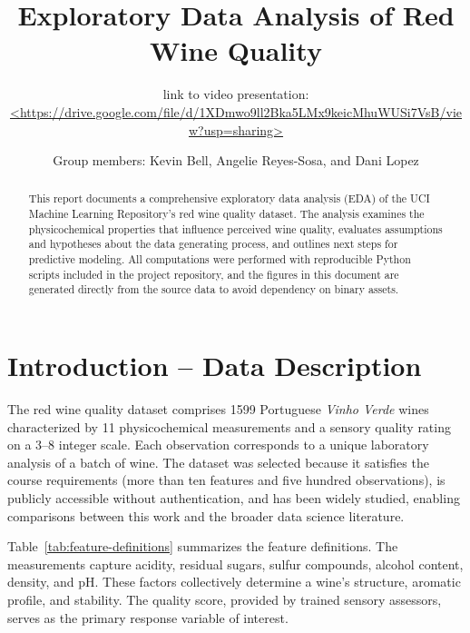 \documentclass[11pt]{article}
\title{Exploratory Data Analysis of Red Wine Quality}
\author{\vspace{-1em}\small link to video presentation: \url{<https://drive.google.com/file/d/1XDmwo9ll2Bka5LMx9keicMhuWUSi7VsB/view?usp=sharing>}}
\date{Group members: Kevin Bell, Angelie Reyes-Sosa, and Dani Lopez}
\begin{document}
\maketitle

\begin{abstract}
This report documents a comprehensive exploratory data analysis (EDA) of the UCI
Machine Learning Repository's red wine quality dataset. The analysis examines
the physicochemical properties that influence perceived wine quality, evaluates
assumptions and hypotheses about the data generating process, and outlines next
steps for predictive modeling. All computations were performed with reproducible
Python scripts included in the project repository, and the figures in this
document are generated directly from the source data to avoid dependency on
binary assets.
\end{abstract}

\section{Introduction -- Data Description}
The red wine quality dataset comprises \num{1599} Portuguese \emph{Vinho Verde}
wines characterized by \num{11} physicochemical measurements and a sensory
quality rating on a \numrange{3}{8} integer scale. Each observation corresponds
to a unique laboratory analysis of a batch of wine. The dataset was selected
because it satisfies the course requirements (more than ten features and five
hundred observations), is publicly accessible without authentication, and has
been widely studied, enabling comparisons between this work and the broader data
science literature.

Table~\ref{tab:feature-definitions} summarizes the feature definitions.
The measurements capture acidity, residual sugars, sulfur compounds, alcohol
content, density, and pH. These factors collectively determine a wine's
structure, aromatic profile, and stability. The quality score, provided by
trained sensory assessors, serves as the primary response variable of interest.
\end{document}
